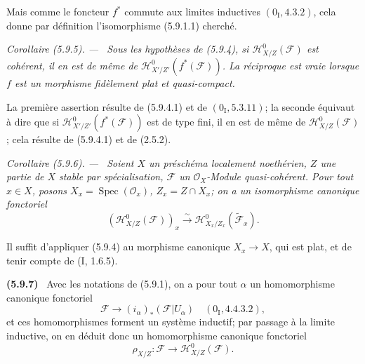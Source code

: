 \documentclass[10pt,oneside]{book}
\newcommand{\oldpage}[2][]{%
  \setcounter{footnote}{0}%
  \marginpar{\scriptsize\textbf{#1}~|~#2}\ignorespaces}
\newenvironment{env}[1][]{\par\medskip\noindent\textbf{(#1)}\ }{\par}
\newenvironment{corollary}[1][]{%
  \par\medskip\noindent\itshape Corollaire (#1). ---\ }{\par}
\begin{document}
\oldpage[IV-2]{111}

Mais comme le foncteur $f^*$ commute aux limites inductives
$(0_{\mathrm I},4.3.2)$, cela donne par définition l'isomorphisme
(5.9.1.1) cherché.

\begin{corollary}[5.9.5]
\label{IV.2.s5.9.5-fr}
Sous les hypothèses de (5.9.4), si
$\mathcal H^0_{X/Z}(\mathcal F)$ est cohérent, il en est de même de
$\mathcal H^0_{X'/Z'}(f^*(\mathcal F))$. La réciproque est vraie lorsque
$f$ est un morphisme fidèlement plat et quasi-compact.
\end{corollary}

La première assertion résulte de (5.9.4.1) et de $(0_{\mathrm I},5.3.11)$;
la seconde équivaut à dire que si
$\mathcal H^0_{X'/Z'}(f^*(\mathcal F))$ est de type fini, il en est de même
de $\mathcal H^0_{X/Z}(\mathcal F)$; cela résulte de (5.9.4.1) et de
(2.5.2).

\begin{corollary}[5.9.6]
\label{IV.2.s5.9.6-fr}
Soient $X$ un préschéma localement noethérien, $Z$ une partie de $X$ stable
par spécialisation, $\mathcal F$ un $\mathcal O_X$-Module quasi-cohérent.
Pour tout $x\in X$, posons $X_x=\operatorname{Spec}(\mathcal O_x)$,
$Z_x=Z\cap X_x$; on a un isomorphisme canonique fonctoriel
\begin{equation}
(\mathcal H^0_{X/Z}(\mathcal F))_x
\xrightarrow{\sim}\mathcal H^0_{X_x/Z_x}(\widetilde{\mathcal F}_x).
\tag{5.9.6.1}\label{IV.2.s5.9.6.1-fr}
\end{equation}
\end{corollary}

Il suffit d'appliquer (5.9.4) au morphisme canonique $X_x\to X$, qui est
plat, et de tenir compte de (I, 1.6.5).

\begin{env}[5.9.7]
\label{IV.2.s5.9.7-fr}
Avec les notations de (5.9.1), on a pour tout $\alpha$ un homomorphisme
canonique fonctoriel
\[
\mathcal F\longrightarrow(i_\alpha)_*(\mathcal F|U_\alpha)
\quad(0_{\mathrm I},4.4.3.2),
\]
et ces homomorphismes forment un système inductif; par passage à la limite
inductive, on en déduit donc un homomorphisme canonique fonctoriel
\begin{equation}
\rho_{X/Z}:\mathcal F\longrightarrow\mathcal H^0_{X/Z}(\mathcal F).
\tag{5.9.7.1}\label{IV.2.s5.9.7.1-fr}
\end{equation}
\end{env}
\end{document}
